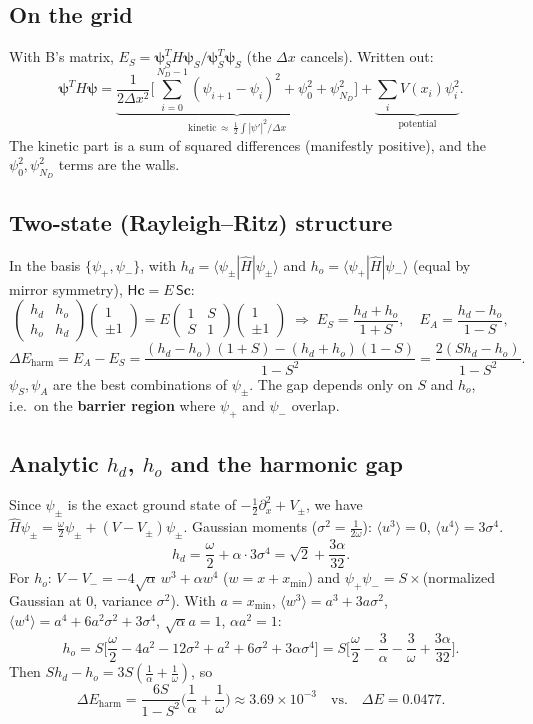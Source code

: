 \documentclass[10pt]{article}
\begin{document}
\subsection{On the grid}
With B's matrix, $E_S=\boldsymbol\psi_S^TH\boldsymbol\psi_S/\boldsymbol\psi_S^T\boldsymbol\psi_S$ (the $\Delta x$ cancels). Written out:
\[
\boldsymbol\psi^TH\boldsymbol\psi=\underbrace{\frac1{2\Delta x^2}\Big[\sum_{i=0}^{N_D-1}(\psi_{i+1}-\psi_i)^2+\psi_0^2+\psi_{N_D}^2\Big]}_{\text{kinetic}\,\approx\,\frac12\int|\psi'|^2/\Delta x}+\underbrace{\sum_iV(x_i)\psi_i^2}_{\text{potential}} .
\]
The kinetic part is a sum of squared differences (manifestly positive), and the $\psi_0^2,\psi_{N_D}^2$ terms are the walls.

\subsection{Two-state (Rayleigh--Ritz) structure}
In the basis $\{\psi_+,\psi_-\}$, with $h_d=\langle\psi_\pm|\hat H|\psi_\pm\rangle$ and $h_o=\langle\psi_+|\hat H|\psi_-\rangle$ (equal by mirror symmetry), $\mathsf H\boldsymbol c=E\,\mathsf S\boldsymbol c$:
\[
\begin{pmatrix}h_d&h_o\\h_o&h_d\end{pmatrix}\begin{pmatrix}1\\\pm1\end{pmatrix}=E\begin{pmatrix}1&S\\S&1\end{pmatrix}\begin{pmatrix}1\\\pm1\end{pmatrix}
\;\Rightarrow\;
E_S=\frac{h_d+h_o}{1+S},\quad E_A=\frac{h_d-h_o}{1-S},
\]
\[
\Delta E_\text{harm}=E_A-E_S=\frac{(h_d-h_o)(1+S)-(h_d+h_o)(1-S)}{1-S^2}=\frac{2(Sh_d-h_o)}{1-S^2}.
\]
$\psi_S,\psi_A$ are the best combinations of $\psi_\pm$. The gap depends only on $S$ and $h_o$, i.e.\ on the \textbf{barrier region} where $\psi_+$ and $\psi_-$ overlap.

\subsection{Analytic $h_d$, $h_o$ and the harmonic gap}
Since $\psi_\pm$ is the exact ground state of $-\frac12\partial_x^2+V_\pm$, we have $\hat H\psi_\pm=\frac\omega2\psi_\pm+(V-V_\pm)\psi_\pm$. Gaussian moments ($\sigma^2=\frac1{2\omega}$): $\langle u^3\rangle=0$, $\langle u^4\rangle=3\sigma^4$.
\[
h_d=\frac\omega2+\alpha\cdot3\sigma^4=\sqrt2+\frac{3\alpha}{32}.
\]
For $h_o$: $V-V_-=-4\sqrt\alpha\,w^3+\alpha w^4$ ($w=x+x_{\min}$) and $\psi_+\psi_-=S\times$(normalized Gaussian at $0$, variance $\sigma^2$). With $a=x_{\min}$, $\langle w^3\rangle=a^3+3a\sigma^2$, $\langle w^4\rangle=a^4+6a^2\sigma^2+3\sigma^4$, $\sqrt\alpha a=1$, $\alpha a^2=1$:
\[
h_o=S\Big[\frac\omega2-4a^2-12\sigma^2+a^2+6\sigma^2+3\alpha\sigma^4\Big]=S\Big[\frac\omega2-\frac3\alpha-\frac3\omega+\frac{3\alpha}{32}\Big].
\]
Then $Sh_d-h_o=3S(\frac1\alpha+\frac1\omega)$, so
\[
\boxed{\Delta E_\text{harm}=\frac{6S}{1-S^2}\Big(\frac1\alpha+\frac1\omega\Big)}\approx3.69\times10^{-3}\quad\text{vs.}\quad\Delta E=0.0477 .
\]
\end{document}
